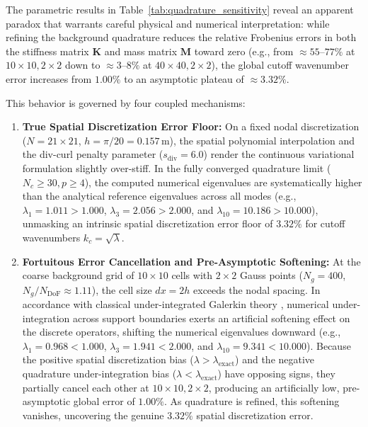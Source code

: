 \documentclass[preprint,12pt]{elsarticle}
\begin{document}
The parametric results in Table~\ref{tab:quadrature_sensitivity} reveal an apparent paradox that warrants careful physical and numerical interpretation: while refining the background quadrature reduces the relative Frobenius errors in both the stiffness matrix $\mathbf{K}$ and mass matrix $\mathbf{M}$ toward zero (e.g., from $\approx 55\text{--}77\%$ at $10 \times 10, 2 \times 2$ down to $\approx 3\text{--}8\%$ at $40 \times 40, 2 \times 2$), the global cutoff wavenumber error increases from $1.00\%$ to an asymptotic plateau of $\approx 3.32\%$. 

This behavior is governed by four coupled mechanisms:
\begin{enumerate}
    \item \textbf{True Spatial Discretization Error Floor:} On a fixed nodal discretization ($N = 21 \times 21$, $h = \pi/20 = 0.157$\,m), the spatial polynomial interpolation and the div-curl penalty parameter ($s_{\mathrm{div}} = 6.0$) render the continuous variational formulation slightly over-stiff. In the fully converged quadrature limit ($N_c \ge 30, p \ge 4$), the computed numerical eigenvalues are systematically higher than the analytical reference eigenvalues across all modes (e.g., $\lambda_1 = 1.011 > 1.000$, $\lambda_3 = 2.056 > 2.000$, and $\lambda_{10} = 10.186 > 10.000$), unmasking an intrinsic spatial discretization error floor of $3.32\%$ for cutoff wavenumbers $k_c = \sqrt{\lambda}$.
    
    \item \textbf{Fortuitous Error Cancellation and Pre-Asymptotic Softening:} At the coarse background grid of $10 \times 10$ cells with $2 \times 2$ Gauss points ($N_g = 400$, $N_g / N_{\mathrm{DoF}} \approx 1.11$), the cell size $dx = 2h$ exceeds the nodal spacing. In accordance with classical under-integrated Galerkin theory \cite{belytschko1994element, dolbow1999numerical}, numerical under-integration across support boundaries exerts an artificial softening effect on the discrete operators, shifting the numerical eigenvalues downward (e.g., $\lambda_1 = 0.968 < 1.000$, $\lambda_3 = 1.941 < 2.000$, and $\lambda_{10} = 9.341 < 10.000$). Because the positive spatial discretization bias ($\lambda > \lambda_{\mathrm{exact}}$) and the negative quadrature under-integration bias ($\lambda < \lambda_{\mathrm{exact}}$) have opposing signs, they partially cancel each other at $10 \times 10, 2 \times 2$, producing an artificially low, pre-asymptotic global error of $1.00\%$. As quadrature is refined, this softening vanishes, uncovering the genuine $3.32\%$ spatial discretization error.
    

\end{enumerate}
\end{document}
